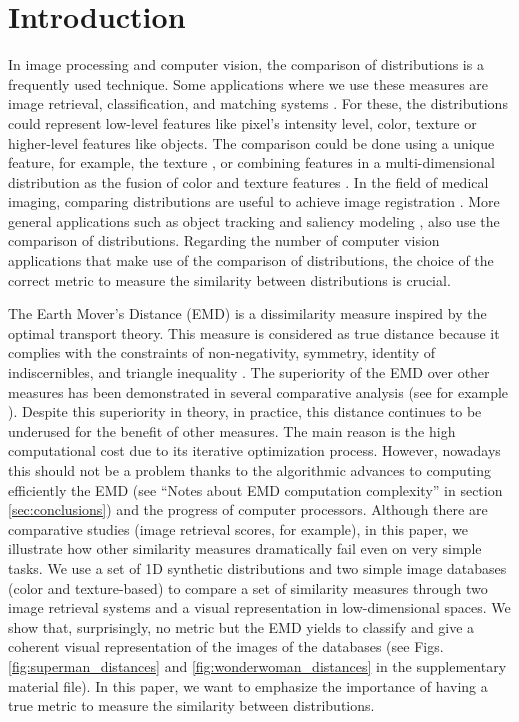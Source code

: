 \section{Introduction}\label{sec:introduction}
In image processing and computer vision, the comparison of distributions is a frequently used technique. Some applications where we use these measures are image retrieval, classification, and matching systems \citep{Smeulders.Worring.ea:PAMI:2000}. For these, the distributions could represent low-level features like pixel's intensity level, color, texture or higher-level features like objects. The comparison could be done using a unique feature, for example, the texture \citep{Banerjee.Bhunia.ea:ESWA:2018, Kwitt.Uhl:ICIP:2008}, or combining features in a multi-dimensional distribution as the fusion of color and texture features \citep{Liu.Guo.ea:IS:2017}. In the field of medical imaging, comparing distributions are useful to achieve image registration \citep{So.Chung:JPR:2017}. More general applications such as object tracking \citep{Nejhum.Ho.ea:CVPR:2008, Klein.Frintrop:CV:2011} and  saliency modeling \citep{Bylinskii.Judd.ea:PAMI:2018}, also use the comparison of distributions. Regarding the number of computer vision applications that make use of the comparison of distributions, the choice of the correct metric to measure the similarity between distributions is crucial. 

The Earth Mover's Distance (EMD) \citep{Rubner.Tomasi.ea:IJCV:2000} is a dissimilarity measure inspired by the optimal transport theory. This measure is considered as true distance because it complies with the constraints of non-negativity, symmetry, identity of indiscernibles, and triangle inequality \citep{Peyre.Cuturi:arXiv:2018}. The superiority of the EMD over other measures has been demonstrated in several comparative analysis (see for example \citep{Puzicha.Buhmann.ea:ICCV:1999, Rubner.Tomasi.ea:IJCV:2000}). Despite this superiority in theory, in practice, this distance continues to be underused for the benefit of other measures. The main reason is the high computational cost due to its iterative optimization process. However, nowadays this should not be a problem thanks to the algorithmic advances to computing efficiently the EMD (see ``Notes about EMD computation complexity'' in section \ref{sec:conclusions}) and the progress of computer processors. Although there are comparative studies (image retrieval scores, for example), in this paper, we illustrate how other similarity measures dramatically fail even on very simple tasks. We use a set of 1D synthetic distributions and two simple image databases (color and texture-based) to compare a set of similarity measures through two image retrieval systems and a visual representation in low-dimensional spaces. We show that, surprisingly, no metric but the EMD yields to classify and give a coherent visual representation of the images of the databases (see Figs. \ref{fig:superman_distances} and \ref{fig:wonderwoman_distances} in the supplementary material file). In this paper, we want to emphasize the importance of having a true metric to measure the similarity between distributions.

